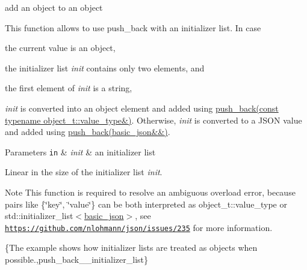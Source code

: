 add an object to an object 

This function allows to use {\ttfamily push\+\_\+back} with an initializer list. In case


\begin{DoxyEnumerate}
\item the current value is an object,
\item the initializer list {\itshape init} contains only two elements, and
\item the first element of {\itshape init} is a string,
\end{DoxyEnumerate}

{\itshape init} is converted into an object element and added using \hyperlink{classnlohmann_1_1basic__json_ae11a3a51782c058fff2f6550cdfb9b3c}{push\+\_\+back(const typename object\+\_\+t\+::value\+\_\+type\&)}. Otherwise, {\itshape init} is converted to a J\+S\+ON value and added using \hyperlink{classnlohmann_1_1basic__json_ac8e523ddc8c2dd7e5d2daf0d49a9c0d7}{push\+\_\+back(basic\+\_\+json\&\&)}.


\begin{DoxyParams}[1]{Parameters}
\mbox{\tt in}  & {\em init} & an initializer list\\
\hline
\end{DoxyParams}
Linear in the size of the initializer list {\itshape init}.

\begin{DoxyNote}{Note}
This function is required to resolve an ambiguous overload error, because pairs like {\ttfamily \{\char`\"{}key\char`\"{}, \char`\"{}value\char`\"{}\}} can be both interpreted as {\ttfamily object\+\_\+t\+::value\+\_\+type} or {\ttfamily std\+::initializer\+\_\+list$<$\hyperlink{classnlohmann_1_1basic__json}{basic\+\_\+json}$>$}, see \href{https://github.com/nlohmann/json/issues/235}{\tt https\+://github.\+com/nlohmann/json/issues/235} for more information.
\end{DoxyNote}
\{The example shows how initializer lists are treated as objects when possible.,push\+\_\+back\+\_\+\+\_\+initializer\+\_\+list\} 
